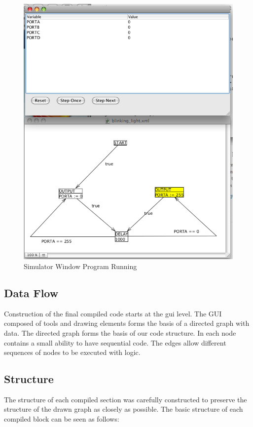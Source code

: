 \begin{figure}[htp]
    \centering
    \includegraphics[width=\imgmedium]{./images/plcedit_simulator_running.png}
    \caption{Simulator Window Program Running}
    \label{fig:plcedit_simulator_running}
\end{figure}





\subsection{Data Flow}
Construction of the final compiled code starts at the gui level. The GUI composed of tools and drawing elements forms the basis of a directed graph with data. The directed graph forms the basis of our code structure. In each node contains a small ability to have sequential code. The edges allow different sequences of nodes to be executed with logic.

\subsection{Structure}
The structure of each compiled section was carefully constructed to preserve the structure of the drawn graph as closely as possible. The basic structure of each compiled block can be seen as follows:

